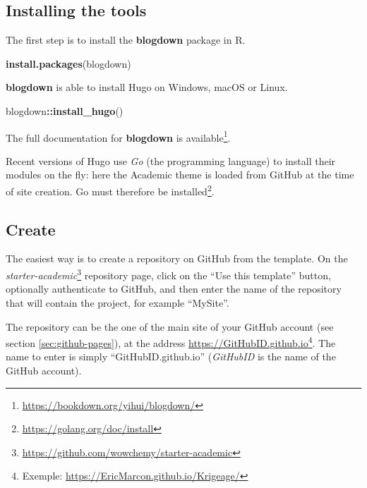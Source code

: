 \documentclass[
  12pt,
  american,
  a4paper,
  extrafontsizes,onecolumn,openright
  ]{memoir}
\newenvironment{Shaded}{\begin{snugshade}}{\end{snugshade}}
\newcommand{\FunctionTok}[1]{\textcolor[rgb]{0.13,0.29,0.53}{\textbf{#1}}}
\newcommand{\NormalTok}[1]{#1}
\newcommand{\SpecialCharTok}[1]{\textcolor[rgb]{0.81,0.36,0.00}{\textbf{#1}}}
\newcommand{\StringTok}[1]{\textcolor[rgb]{0.31,0.60,0.02}{#1}}
\begin{document}
\subsection{Installing the tools}\label{installing-the-tools}

The first step is to install the \textbf{blogdown} package in R.

\scriptsize

\begin{Shaded}
\begin{Highlighting}[]
\FunctionTok{install.packages}\NormalTok{(}\StringTok{\textquotesingle{}blogdown\textquotesingle{}}\NormalTok{) }
\end{Highlighting}
\end{Shaded}

\normalsize

\textbf{blogdown} is able to install Hugo on Windows, macOS or Linux.

\scriptsize

\begin{Shaded}
\begin{Highlighting}[]
\NormalTok{blogdown}\SpecialCharTok{::}\FunctionTok{install\_hugo}\NormalTok{()}
\end{Highlighting}
\end{Shaded}

\normalsize

The full documentation for \textbf{blogdown} is available\footnote{\url{https://bookdown.org/yihui/blogdown/}}.

Recent versions of Hugo use \emph{Go} (the programming language) to install their modules on the fly: here the Academic theme is loaded from GitHub at the time of site creation.
Go must therefore be installed\footnote{\url{https://golang.org/doc/install}}.

\subsection{Create}\label{create-2}

The easiest way is to create a repository on GitHub from the template.
On the \emph{starter-academic}\footnote{\url{https://github.com/wowchemy/starter-academic}} repository page, click on the \enquote{Use this template} button, optionally authenticate to GitHub, and then enter the name of the repository that will contain the project, for example \enquote{MySite}.

The repository can be the one of the main site of your GitHub account (see section \ref{sec:github-pages}), at the address \url{https://GitHubID.github.io}\footnote{Exemple: \url{https://EricMarcon.github.io/Krigeage/}}.
The name to enter is simply \enquote{GitHubID.github.io} (\emph{GitHubID} is the name of the GitHub account).
\end{document}
